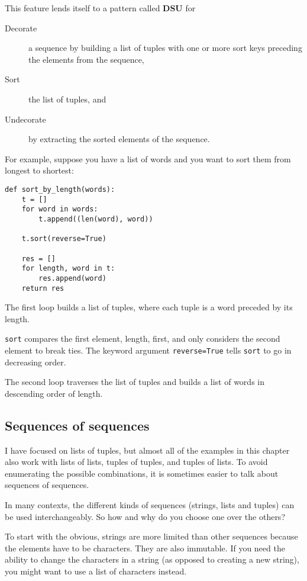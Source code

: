 \documentclass{article}
\begin{document}
This feature lends itself to a pattern called \textbf{DSU} for
\begin{description}
    \item [Decorate] a sequence by building a list of tuples with
        one or more sort keys preceding the elements from the
        sequence,
    \item [Sort] the list of tuples, and
    \item [Undecorate] by extracting the sorted elements of the
        sequence.
\end{description}
For example, suppose you have a list of words and you want to sort
them from longest to shortest:
\begin{verbatim}
def sort_by_length(words):
    t = []
    for word in words:
        t.append((len(word), word))

    t.sort(reverse=True)

    res = []
    for length, word in t:
        res.append(word)
    return res
\end{verbatim}
The first loop builds a list of tuples, where each tuple is a word
preceded by its length.

\verb|sort| compares the first element, length, first, and only considers the
second element to break ties. The keyword argument \verb|reverse=True| tells
\verb|sort| to go in decreasing order.

The second loop traverses the list of tuples and builds a list of
words in descending order of length.

\subsection{Sequences of sequences}
I have focused on lists of tuples, but almost all of the examples in
this chapter also work with lists of lists, tuples of tuples, and
tuples of lists. To avoid enumerating the possible combinations, it is
sometimes easier to talk about sequences of sequences.

In many contexts, the different kinds of sequences (strings, lists and
tuples) can be used interchangeably. So how and why do you choose one
over the others?

To start with the obvious, strings are more limited than other
sequences because the elements have to be characters. They are also
immutable. If you need the ability to change the characters in a
string (as opposed to creating a new string), you might want to use a
list of characters instead.
\end{document}
